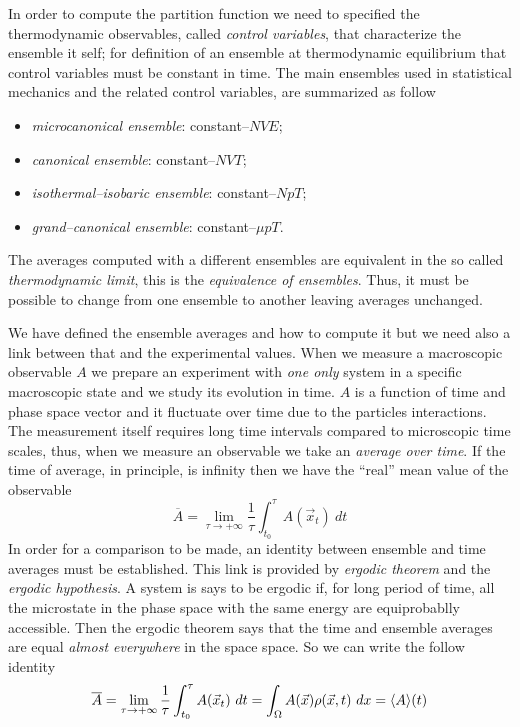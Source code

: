 In order to compute the partition function we need to specified the thermodynamic observables, called \textit{control variables}, that characterize the ensemble it self; for definition of an ensemble at thermodynamic equilibrium that control variables must be constant in time. The main ensembles used in statistical mechanics and the related control variables, are summarized as follow
\begin{itemize}
	\item \textit{microcanonical ensemble}: constant--$NVE$; %
	\item \textit{canonical ensemble}: constant--$NVT$; %
	\item \textit{isothermal--isobaric ensemble}: constant--$NpT$; %
	\item \textit{grand--canonical ensemble}: constant--$\mu pT$.%
\end{itemize}
The averages computed with a different ensembles are equivalent in the so called \textit{thermodynamic limit}, this is the \textit{equivalence of ensembles}. Thus, it must be possible to change from one ensemble to another leaving averages unchanged.

We have defined the ensemble averages and how to compute it but we need also a link between that and the experimental values. When we measure a macroscopic observable $A$ we prepare an experiment with \textit{one only} system in a specific macroscopic state and we study its evolution in time. $A$ is a function of time and phase space vector and it fluctuate over time due to the particles interactions. The measurement itself requires long time intervals compared to microscopic time scales, thus, when we measure an observable we take an \textit{average over time}. If the time of average, in principle, is infinity then we have the ``real'' mean value of the observable
\begin{equation*}
	\overline{A} = \lim_{\tau\to +\infty}\frac{1}{\tau}\int_{t_0}^\tau A(\vec x_t)\ dt
	\label{eq:timeAve}
\end{equation*}
In order for a comparison to be made, an identity between ensemble and time averages must be established. This link is provided by \textit{ergodic theorem} and the \textit{ergodic hypothesis}. A system is says to be ergodic if, for long period of time, all the microstate in the phase space with the same energy are equiprobablly accessible. Then the ergodic theorem says that the time and ensemble averages are equal \textit{almost everywhere} in the space space. So we can write the follow identity
\begin{equation}
	\overline{A} = \lim_{\tau\to +\infty}\frac{1}{\tau}\int_{t_0}^\tau A(\vec x_t)\ dt = \int_\Omega A(\vec x)\rho(\vec x, t)\ dx = \langle A \rangle(t)
\end{equation}

